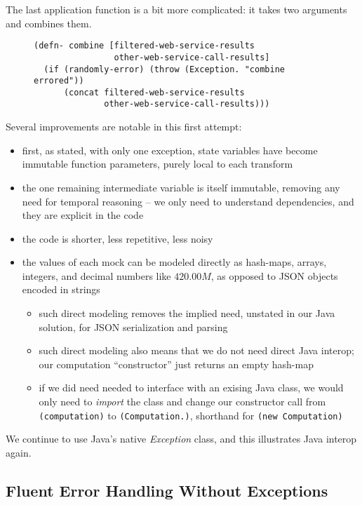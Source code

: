 \documentclass[11pt]{article}
\begin{document}
The last application function is a bit more complicated: it takes
two arguments and combines them. 

\begin{figure}[H]
\label{functional-helpers-5}
\begin{verbatim}
(defn- combine [filtered-web-service-results
                other-web-service-call-results]
  (if (randomly-error) (throw (Exception. "combine errored"))
      (concat filtered-web-service-results
              other-web-service-call-results)))
\end{verbatim}
\end{figure}

Several improvements are notable in this first attempt:
\begin{itemize}
\item first, as stated, with only one exception, state variables have
become immutable function parameters, purely local to each
transform
\item the one remaining intermediate variable is itself immutable,
removing any need for temporal reasoning -- we only need to
understand dependencies, and they are explicit in the code
\item the code is shorter, less repetitive, less noisy
\item the values of each mock can be modeled directly as hash-maps,
arrays, integers, and decimal numbers like $420.00M$, as opposed
to JSON objects encoded in strings
\begin{itemize}
\item such direct modeling removes the implied need, unstated in our
Java solution, for JSON serialization and parsing
\item such direct modeling also means that we do not need direct Java
interop; our computation ``constructor'' just returns an empty
hash-map
\item if we did need needed to interface with an exising Java class,
we would only need to \emph{import} the class and change our
constructor call from \verb|(computation)| to
\verb|(Computation.)|, shorthand for 
\verb|(new Computation)|
\end{itemize}
\end{itemize}

We continue to use Java's native \emph{Exception} class, and this
illustrates Java interop again.
\subsection{Fluent Error Handling Without Exceptions}
\label{sec-3-2}
\end{document}
